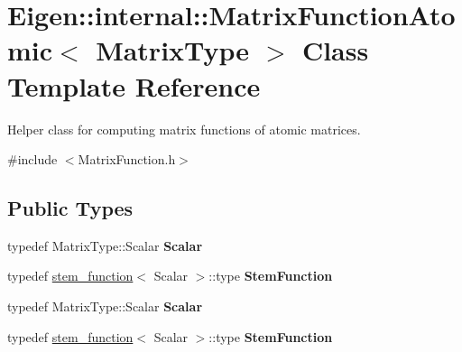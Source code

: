 \hypertarget{class_eigen_1_1internal_1_1_matrix_function_atomic}{}\section{Eigen\+:\+:internal\+:\+:Matrix\+Function\+Atomic$<$ Matrix\+Type $>$ Class Template Reference}
\label{class_eigen_1_1internal_1_1_matrix_function_atomic}


Helper class for computing matrix functions of atomic matrices.  




{\ttfamily \#include $<$Matrix\+Function.\+h$>$}

\subsection*{Public Types}
\begin{DoxyCompactItemize}
\item 
\mbox{\label{class_eigen_1_1internal_1_1_matrix_function_atomic_a36e1110dfad326a36f2024128a7cd57f}} 
typedef Matrix\+Type\+::\+Scalar {\bfseries Scalar}
\item 
\mbox{\label{class_eigen_1_1internal_1_1_matrix_function_atomic_ae4e08534a2fec6687f96ab5d72520ddc}} 
typedef \hyperlink{struct_eigen_1_1internal_1_1stem__function}{stem\+\_\+function}$<$ Scalar $>$\+::type {\bfseries Stem\+Function}
\item 
\mbox{\label{class_eigen_1_1internal_1_1_matrix_function_atomic_a36e1110dfad326a36f2024128a7cd57f}} 
typedef Matrix\+Type\+::\+Scalar {\bfseries Scalar}
\item 
\mbox{\label{class_eigen_1_1internal_1_1_matrix_function_atomic_ae4e08534a2fec6687f96ab5d72520ddc}} 
typedef \hyperlink{struct_eigen_1_1internal_1_1stem__function}{stem\+\_\+function}$<$ Scalar $>$\+::type {\bfseries Stem\+Function}
\end{DoxyCompactItemize}
